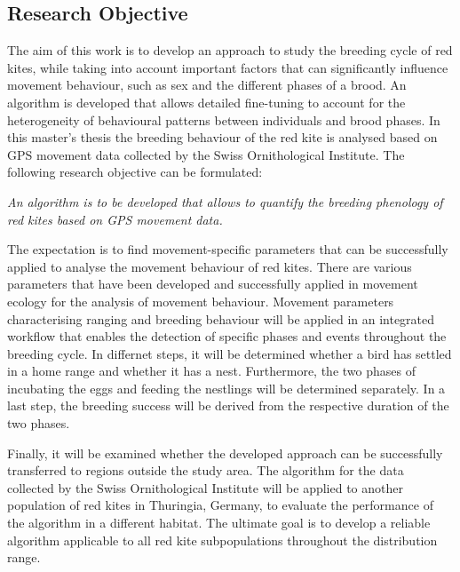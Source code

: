 \subsection{Research Objective}

The aim of this work is to develop an approach to study the breeding cycle of red kites, while taking into account important factors that can significantly influence movement behaviour, such as sex and the different phases of a brood. An algorithm is developed that allows detailed fine-tuning to account for the heterogeneity of behavioural patterns between individuals and brood phases. In this master’s thesis the breeding behaviour of the red kite is analysed based on GPS movement data collected by the Swiss Ornithological Institute. The following research objective can be formulated:

\vspace{1\baselineskip}

\begin{center}
    \textit{An algorithm is to be developed that allows to quantify the breeding phenology of red kites based on GPS movement data.}
\end{center}

\vspace{1\baselineskip}

The expectation is to find movement-specific parameters that can be successfully applied to analyse the movement behaviour of red kites. There are various parameters that have been developed and successfully applied in movement ecology for the analysis of movement behaviour. Movement parameters characterising ranging and breeding behaviour will be applied in an integrated workflow that enables the detection of specific phases and events throughout the breeding cycle. In differnet steps, it will be determined whether a bird has settled in a home range and whether it has a nest. Furthermore, the two phases of incubating the eggs and feeding the nestlings will be determined separately. In a last step, the breeding success will be derived from the respective duration of the two phases.

Finally, it will be examined whether the developed approach can be successfully transferred to regions outside the study area. The algorithm for the data collected by the Swiss Ornithological Institute will be applied to another population of red kites in Thuringia, Germany, to evaluate the performance of the algorithm in a different habitat. The ultimate goal is to develop a reliable algorithm applicable to all red kite subpopulations throughout the distribution range.
